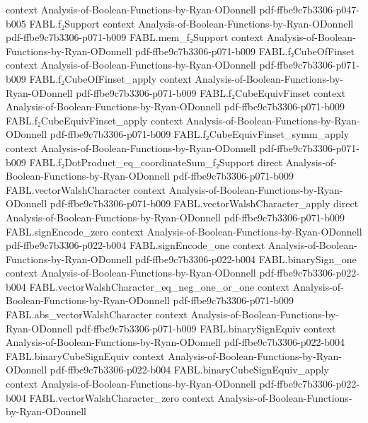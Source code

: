\begin{theorem}
  {context}
  {Analysis-of-Boolean-Functions-by-Ryan-ODonnell}
  {pdf-ffbe9c7b3306-p047-b005}
\proofstep
  {FABL.f₂Support}
  {context}
  {Analysis-of-Boolean-Functions-by-Ryan-ODonnell}
  {pdf-ffbe9c7b3306-p071-b009}
\proofstep
  {FABL.mem_f₂Support}
  {context}
  {Analysis-of-Boolean-Functions-by-Ryan-ODonnell}
  {pdf-ffbe9c7b3306-p071-b009}
\proofstep
  {FABL.f₂CubeOfFinset}
  {context}
  {Analysis-of-Boolean-Functions-by-Ryan-ODonnell}
  {pdf-ffbe9c7b3306-p071-b009}
\proofstep
  {FABL.f₂CubeOfFinset_apply}
  {context}
  {Analysis-of-Boolean-Functions-by-Ryan-ODonnell}
  {pdf-ffbe9c7b3306-p071-b009}
\proofstep
  {FABL.f₂CubeEquivFinset}
  {context}
  {Analysis-of-Boolean-Functions-by-Ryan-ODonnell}
  {pdf-ffbe9c7b3306-p071-b009}
\proofstep
  {FABL.f₂CubeEquivFinset_apply}
  {context}
  {Analysis-of-Boolean-Functions-by-Ryan-ODonnell}
  {pdf-ffbe9c7b3306-p071-b009}
\proofstep
  {FABL.f₂CubeEquivFinset_symm_apply}
  {context}
  {Analysis-of-Boolean-Functions-by-Ryan-ODonnell}
  {pdf-ffbe9c7b3306-p071-b009}
\proofstep
  {FABL.f₂DotProduct_eq_coordinateSum_f₂Support}
  {direct}
  {Analysis-of-Boolean-Functions-by-Ryan-ODonnell}
  {pdf-ffbe9c7b3306-p071-b009}
\proofstep
  {FABL.vectorWalshCharacter}
  {context}
  {Analysis-of-Boolean-Functions-by-Ryan-ODonnell}
  {pdf-ffbe9c7b3306-p071-b009}
\proofstep
  {FABL.vectorWalshCharacter_apply}
  {direct}
  {Analysis-of-Boolean-Functions-by-Ryan-ODonnell}
  {pdf-ffbe9c7b3306-p071-b009}
\proofstep
  {FABL.signEncode_zero}
  {context}
  {Analysis-of-Boolean-Functions-by-Ryan-ODonnell}
  {pdf-ffbe9c7b3306-p022-b004}
\proofstep
  {FABL.signEncode_one}
  {context}
  {Analysis-of-Boolean-Functions-by-Ryan-ODonnell}
  {pdf-ffbe9c7b3306-p022-b004}
\proofstep
  {FABL.binarySign_one}
  {context}
  {Analysis-of-Boolean-Functions-by-Ryan-ODonnell}
  {pdf-ffbe9c7b3306-p022-b004}
\proofstep
  {FABL.vectorWalshCharacter_eq_neg_one_or_one}
  {context}
  {Analysis-of-Boolean-Functions-by-Ryan-ODonnell}
  {pdf-ffbe9c7b3306-p071-b009}
\proofstep
  {FABL.abs_vectorWalshCharacter}
  {context}
  {Analysis-of-Boolean-Functions-by-Ryan-ODonnell}
  {pdf-ffbe9c7b3306-p071-b009}
\proofstep
  {FABL.binarySignEquiv}
  {context}
  {Analysis-of-Boolean-Functions-by-Ryan-ODonnell}
  {pdf-ffbe9c7b3306-p022-b004}
\proofstep
  {FABL.binaryCubeSignEquiv}
  {context}
  {Analysis-of-Boolean-Functions-by-Ryan-ODonnell}
  {pdf-ffbe9c7b3306-p022-b004}
\proofstep
  {FABL.binaryCubeSignEquiv_apply}
  {context}
  {Analysis-of-Boolean-Functions-by-Ryan-ODonnell}
  {pdf-ffbe9c7b3306-p022-b004}
\proofstep
  {FABL.vectorWalshCharacter_zero}
  {context}
  {Analysis-of-Boolean-Functions-by-Ryan-ODonnell}

\end{theorem}
